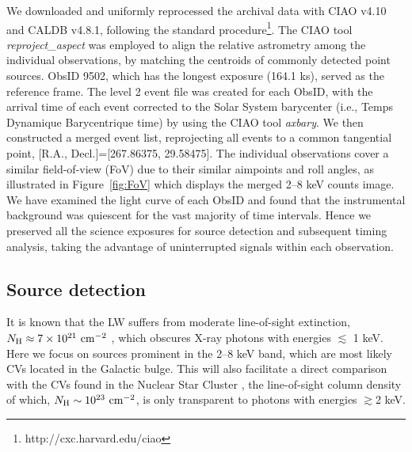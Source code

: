 \documentclass[fleqn,usenatbib]{mnras}
\begin{document}
We downloaded and uniformly reprocessed the archival data with CIAO v4.10 and CALDB v4.8.1, following the standard procedure\footnote{http://cxc.harvard.edu/ciao}.
The CIAO tool \emph{reproject\_aspect} was employed to align the relative astrometry among the individual observations, by matching the centroids of commonly detected point sources. ObsID 9502, which has the longest exposure (164.1 ks), served as the reference frame.
The level 2 event file was created for each ObsID, with the arrival time of each event corrected to the Solar System barycenter (i.e., Temps Dynamique Barycentrique time) by using the CIAO tool \emph{axbary}.
We then constructed a merged event list, reprojecting all events to a common tangential point, [R.A., Decl.]=[267.86375, 29.58475].
The individual observations cover a similar field-of-view (FoV) due to their similar aimpoints and roll angles, as illustrated in Figure~\ref{fig:FoV} which displays the merged 2--8 keV counts image.
We have examined the light curve of each ObsID and found that the instrumental background was quiescent for the vast majority of time intervals.
Hence we preserved all the science exposures for source detection and subsequent timing analysis, taking the advantage of uninterrupted signals within each observation.  

\subsection{Source detection}\label{subsec:detect}
It is known that the LW suffers from moderate line-of-sight extinction, $N_{\rm H} \approx 7\times10^{21}{\rm~cm^{-2}}$ \citep{2011MNRAS.414..495R}, which obscures X-ray photons with energies $\lesssim$ 1 keV.
Here we focus on sources prominent in the 2--8 keV band, which are most likely CVs located in the Galactic bulge. This will also facilitate a direct comparison with the CVs found in the Nuclear Star Cluster \citep{2018ApJS..235...26Z}, the line-of-sight column density of which, $N_{\rm H} \sim 10^{23}{\rm~cm^{-2}}$, is only transparent to photons with energies $\gtrsim$2 keV. 
\end{document}
